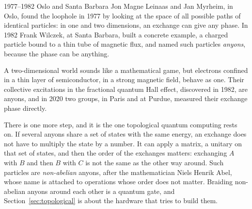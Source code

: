 \begin{history}{1977--1982 \textperiodcentered{} Oslo and Santa Barbara}
Jon Magne Leinaas and Jan Myrheim, in Oslo, found the loophole in 1977 by looking at
the space of all possible paths of identical particles: in one and two dimensions, an
exchange can give any phase. In 1982 Frank Wilczek, at Santa Barbara, built a concrete
example, a charged particle bound to a thin tube of magnetic flux, and named such
particles \emph{anyons}, because the phase can be anything.
\end{history}

A two-dimensional world sounds like a mathematical game, but electrons confined in a
thin layer of semiconductor, in a strong magnetic field, behave as one. Their collective
excitations in the fractional quantum Hall effect, discovered in 1982, are anyons, and in
2020 two groups, in Paris and at Purdue, measured their exchange phase directly.

There is one more step, and it is the one topological quantum computing rests on. If
several anyons share a set of states with the same energy, an exchange does not have to
multiply the state by a number. It can apply a matrix, a unitary on that set of states,
and then the order of the exchanges matters: exchanging $A$ with $B$ and then $B$ with
$C$ is not the same as the other way around. Such particles are \emph{non-abelian}
anyons, after the mathematician Niels Henrik Abel, whose name is attached to operations
whose order does not matter. Braiding non-abelian anyons around each other is a quantum
gate, and Section~\ref{sec:topological} is about the hardware that tries to build them.
